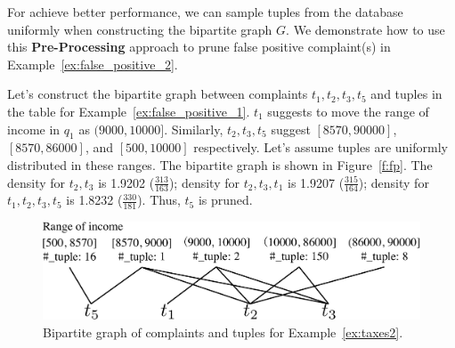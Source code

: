   For achieve better performance, we can sample tuples
  from the database uniformly when constructing the bipartite graph $G$. 
  We demonstrate how to use this \textbf{Pre-Processing} 
  approach to prune false positive complaint(s) in Example~\ref{ex:false_positive_2}. 
  \begin{example}
  \label{ex:false_positive_2}
  Let's construct the bipartite graph between complaints $t_1, t_2, t_3, t_5$ 
  and tuples in the table for Example~\ref{ex:false_positive_1}. 
  $t_1$ suggests to move the range of income in $q_1$ 
  as $(9000, 10000]$. Similarly, $t_2, t_3, t_5$ suggest $[8570, 90000]$, 
  $[8570, 86000]$, and $[500, 10000]$ respectively. Let's assume tuples are
  uniformly distributed in these ranges. The bipartite graph is shown in 
  Figure~\ref{f:fp}. The density for $t_2, t_3$ is 1.9202 ($\frac{313}{163}$);
  density for $t_2, t_3, t_1$ is 1.9207 ($\frac{315}{164}$); density for 
  $t_1, t_2, t_3, t_5$ is 1.8232 ($\frac{330}{181}$). Thus, $t_5$ is pruned. 
  \begin{figure}[ht]
  \centering
  \includegraphics[width = 0.85\columnwidth]{figures/falsepositive_example}
  \caption{Bipartite graph of complaints and tuples for Example~\ref{ex:taxes2}. }
  \label{f:pf} 
  \end{figure}
  \end{example}

\fi
